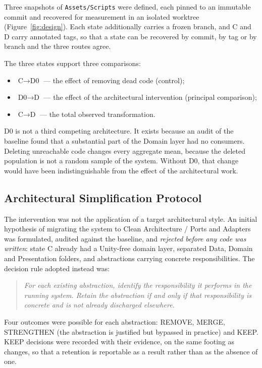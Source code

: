 \documentclass{sbc2019}%
\begin{document}
Three snapshots of \texttt{Assets/Scripts} were defined, each pinned to an
immutable commit and recovered for measurement in an isolated worktree
(Figure~\ref{fig:design}). Each state additionally carries a frozen branch, and
C and D carry annotated tags, so that a state can be recovered by commit, by tag
or by branch and the three routes agree.

The three states support three comparisons:

\begin{itemize}\itemsep2pt
\item $\text{C} \rightarrow \text{D0}$ --- the effect of removing dead code (control);
\item $\text{D0} \rightarrow \text{D}$ --- the effect of the architectural intervention (principal comparison);
\item $\text{C} \rightarrow \text{D}$ --- the total observed transformation.
\end{itemize}

D0 is not a third competing architecture. It exists because an audit of the
baseline found that a substantial part of the Domain layer had no consumers.
Deleting unreachable code changes every aggregate mean, because the deleted
population is not a random sample of the system. Without D0, that change would
have been indistinguishable from the effect of the architectural work.

\subsection{Architectural Simplification Protocol}

The intervention was not the application of a target architectural style. An
initial hypothesis of migrating the system to Clean Architecture / Ports and
Adapters was formulated, audited against the baseline, and \emph{rejected before
any code was written}: state C already had a Unity-free domain layer, separated
Data, Domain and Presentation folders, and abstractions carrying concrete
responsibilities. The decision rule adopted instead was:

\begin{quote}
\emph{For each existing abstraction, identify the responsibility it performs in
the running system. Retain the abstraction if and only if that responsibility is
concrete and is not already discharged elsewhere.}
\end{quote}

Four outcomes were possible for each abstraction: REMOVE, MERGE, STRENGTHEN
(the abstraction is justified but bypassed in practice) and KEEP\@. KEEP decisions
were recorded with their evidence, on the same footing as changes, so that a
retention is reportable as a result rather than as the absence of one.
\end{document}

